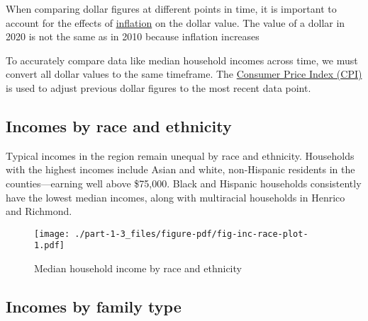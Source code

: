 \documentclass[
  letterpaper,
  DIV=11,
  numbers=noendperiod]{scrreprt}
\begin{document}
\begin{tcolorbox}[enhanced jigsaw, colframe=quarto-callout-important-color-frame, arc=.35mm, bottomrule=.15mm, colbacktitle=quarto-callout-important-color!10!white, opacityback=0, left=2mm, rightrule=.15mm, title=\textcolor{quarto-callout-important-color}{\faExclamation}\hspace{0.5em}{Adjusting for inflation}, colback=white, coltitle=black, toptitle=1mm, leftrule=.75mm, titlerule=0mm, breakable, opacitybacktitle=0.6, toprule=.15mm, bottomtitle=1mm]

When comparing dollar figures at different points in time, it is
important to account for the effects of
\href{https://www.investopedia.com/ask/answers/042415/what-impact-does-inflation-have-time-value-money.asp}{inflation}
on the dollar value. The value of a dollar in 2020 is not the same as in
2010 because inflation increases

To accurately compare data like median household incomes across time, we
must convert all dollar values to the same timeframe. The
\href{https://www.investopedia.com/terms/c/consumerpriceindex.asp}{Consumer
Price Index (CPI)} is used to adjust previous dollar figures to the most
recent data point.

\end{tcolorbox}

\hypertarget{incomes-by-race-and-ethnicity}{%
\subsection{Incomes by race and
ethnicity}\label{incomes-by-race-and-ethnicity}}

Typical incomes in the region remain unequal by race and ethnicity.
Households with the highest incomes include Asian and white,
non-Hispanic residents in the counties---earning well above \$75,000.
Black and Hispanic households consistently have the lowest median
incomes, along with multiracial households in Henrico and Richmond.

\begin{figure}

{\centering \texttt{[image: ./part-1-3\_files/figure-pdf/fig-inc-race-plot-1.pdf]}

}

\caption{\label{fig-inc-race-plot}Median household income by race and
ethnicity}

\end{figure}

\hypertarget{incomes-by-family-type}{%
\subsection{Incomes by family type}\label{incomes-by-family-type}}
\end{document}
